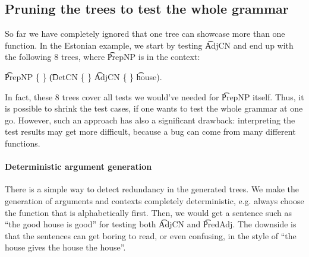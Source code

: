 


\subsection{Pruning the trees to test the whole grammar}
\label{sec:pruning_all}

So far we have completely ignored that one tree can showcase more than
one function. In the Estonian example, we start
by testing \t{AdjCN} and end up with the following 8 trees, where
\t{PrepNP} is in the context: 
\begin{EmptyItem}
\t{PrepNP} \{  \}
             { \t{(DetCN}} \{  \} 
             {\t{AdjCN}}  \{ \} 
             { \t{house)}}.
\end{EmptyItem}
In fact, these 8 trees cover all tests we would've needed for
\t{PrepNP} itself. Thus, it is possible to shrink the test cases, 
if one wants to test the whole grammar at one go. However, such an
approach has also a significant drawback: interpreting the test
results may get more difficult, because a bug can come from many
different functions.


\paragraph{Deterministic argument generation}
There is a simple way to detect redundancy in the generated trees. We
make the generation of arguments and contexts completely
deterministic, e.g. always choose the function that is alphabetically
first. Then, we would get a sentence such as ``the good house is
good'' for testing both \t{AdjCN} and \t{PredAdj}. The downside is
that the sentences can get boring to read, or even confusing, in the
style of ``the house gives the house the house''.

